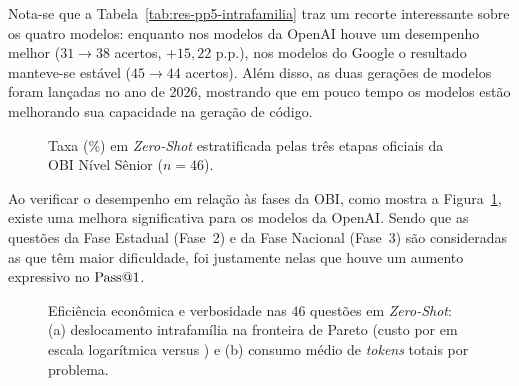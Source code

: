 \begin{table}[!htbp]
\centering
\caption[Evolução intrafamília direta na PP5]{Comparação intrafamília direta entre geração anterior e geração atual ($n = 46$,  \textit{Zero-Shot}).}
\label{tab:res-pp5-intrafamilia}
\small
{}
\end{table}

Nota-se que a Tabela~\ref{tab:res-pp5-intrafamilia} traz um recorte interessante sobre os quatro modelos: enquanto nos modelos da OpenAI houve um desempenho melhor ($31 \rightarrow 38$ acertos, $+15{,}22\text{ p.p.}$), nos modelos do Google o resultado manteve-se estável ($45 \rightarrow 44$ acertos). Além disso, as duas gerações de modelos foram lançadas no ano de 2026, mostrando que em pouco tempo os modelos estão melhorando sua capacidade na geração de código.

\begin{figure}[!htbp]
\centering

\caption[Desempenho por etapa oficial da OBI Sênior na PP5]{Taxa  (\%) em  \textit{Zero-Shot} estratificada pelas três etapas oficiais da OBI Nível Sênior ($n = 46$).}
\label{fig:res-pp5-fases}
\end{figure}
\FloatBarrier

Ao verificar o desempenho em relação às fases da OBI, como mostra a Figura~\ref{fig:res-pp5-fases}, existe uma melhora significativa para os modelos da OpenAI. Sendo que as questões da Fase Estadual (Fase~2) e da Fase Nacional (Fase~3) são consideradas as que têm maior dificuldade, foi justamente nelas que houve um aumento expressivo no $\mathrm{Pass@}1$.

\begin{figure}[!htbp]
\centering

\caption[Fronteira de Pareto e consumo médio de tokens na PP5]{Eficiência econômica e verbosidade nas $46$ questões em  \textit{Zero-Shot}: (a) deslocamento intrafamília na fronteira de Pareto (custo por  em escala logarítmica versus ) e (b) consumo médio de \textit{tokens} totais por problema.}
\label{fig:res-pp5-pareto-tokens}
\end{figure}
\FloatBarrier


